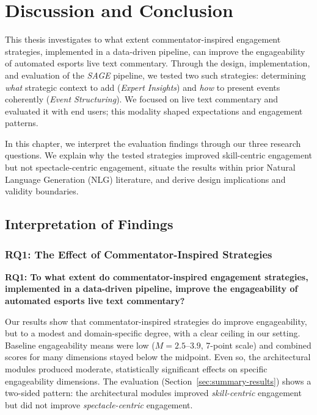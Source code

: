 \chapter{Discussion and Conclusion}\label{chap:discussion}\label{chap:conclusion}

This thesis investigates to what extent commentator-inspired engagement strategies, implemented in a data-driven pipeline, can improve the engageability of automated esports live text commentary. Through the design, implementation, and evaluation of the \textit{SAGE} pipeline, we tested two such strategies: determining \textit{what} strategic context to add (\textit{Expert Insights}) and \textit{how} to present events coherently (\textit{Event Structuring}). We focused on live text commentary and evaluated it with end users; this modality shaped expectations and engagement patterns.

In this chapter, we interpret the evaluation findings through our three research questions. We explain why the tested strategies improved skill-centric engagement but not spectacle-centric engagement, situate the results within prior Natural Language Generation (NLG) literature, and derive design implications and validity boundaries.

\section{Interpretation of Findings}

\subsection{RQ1: The Effect of Commentator-Inspired Strategies}
\textbf{RQ1: To what extent do commentator-inspired engagement strategies, implemented in a data-driven pipeline, improve the engageability of automated esports live text commentary?}

Our results show that commentator-inspired strategies do improve engageability, but to a modest and domain-specific degree, with a clear ceiling in our setting. Baseline engageability means were low ($M=2.5$--$3.9$, 7-point scale) and combined scores for many dimensions stayed below the midpoint. Even so, the architectural modules produced moderate, statistically significant effects on specific engageability dimensions. The evaluation (Section~\ref{sec:summary-results}) shows a two-sided pattern: the architectural modules improved \textit{skill-centric} engagement but did not improve \textit{spectacle-centric} engagement.

